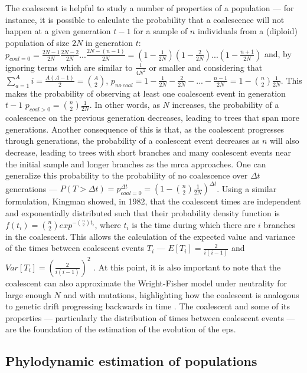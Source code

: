 The coalescent is helpful to study a number of properties of a population --- for instance, it is possible to calculate the probability that a coalescence will not happen at a given generation $t-1$ for a sample of $n$ individuals from a (diploid) population of size $2N$ in generation $t$: $p_{coal=0} = \frac{2N-1}{2N}\frac{2N-2}{2N}...\frac{2N-(n-1)}{2N} = (1 - \frac{1}{2N})(1 - \frac{2}{2N})...(1 - \frac{n+1}{2N})$ and, by ignoring terms which are similar to $\frac{1}{4N^2}$ or smaller and considering that $\sum^A_{a=1}{i} = \frac{A(A-1)}{2} = \binom{A}{2}$, $p_{no\ coal} = 1 - \frac{1}{2N} - \frac{2}{2N} -...- \frac{n-1}{2N} = 1 - \binom{n}{2}\frac{1}{2N}$. This makes the probability of observing at least one coalescent event in generation $t-1$ $p_{coal>0} = \binom{n}{2}\frac{1}{2N}$. In other words, as $N$ increases, the probability of a coalescence on the previous generation decreases, leading to trees that span more generations. Another consequence of this is that, as the coalescent progresses through generations, the probability of a coalescent event decreases as $n$ will also decrease, leading to trees with short branches and many coalescent events near the initial sample and longer branches as the \ac{mrca} approaches. One can generalize this probability to the probability of no coalescence over $\Delta t$ generations --- $P(T > \Delta t) = p_{coal=0}^{\Delta t} = (1-\binom{n}{2}\frac{1}{2N})^{\Delta t}$. Using a similar formulation, Kingman showed, in 1982, that the coalescent times are independent and exponentially distributed such that their probability density function is $f(t_i) = \binom{n}{2}exp^{-\binom{n}{2}t_i}$, where $t_i$ is the time during which there are $i$ branches in the coalescent. This allows the calculation of the expected value and variance of the times between coalescent events $T_i$ --- $E[T_i] = \frac{2}{i(i-1)}$ and $Var[T_i] = (\frac{2}{i(i-1)})^2$ \cite{Kingman1982-tc}. At this point, it is also important to note that the coalescent can also approximate the Wright-Fisher model under neutrality for large enough $N$ and with mutations, highlighting how the coalescent is analogous to genetic drift progressing backwards in time \cite{Wakeley2008-wh}. The coalescent and some of its properties --- particularly the distribution of times between coalescent events --- are the foundation of the estimation of the evolution of the \ac{eps}.

\subsection{Phylodynamic estimation of populations}

